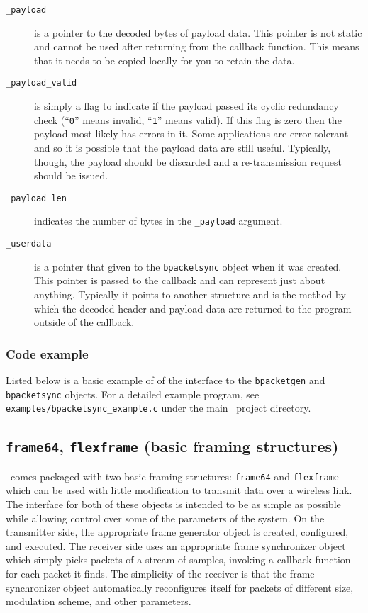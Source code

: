 %
\begin{description}
\item[{\tt \_payload}]
    is a pointer to the decoded bytes of payload data.
    This pointer is not static and cannot be used after returning from
    the callback function.
    This means that it needs to be copied locally for you to retain the
    data.
\item[{\tt \_payload\_valid}]
    is simply a flag to indicate if the payload passed its cyclic
    redundancy check
    (``{\tt 0}'' means invalid, ``{\tt 1}'' means valid).
    If this flag is zero then the payload most likely has errors in it.
    Some applications are error tolerant and so it is possible that the
    payload data are still useful.
    Typically, though, the payload should be discarded and a
    re-transmission request should be issued.
\item[{\tt \_payload\_len}]
    indicates the number of bytes in the {\tt \_payload} argument.
\item[{\tt \_userdata}]
    is a pointer that given to the {\tt bpacketsync} object when it was
    created.
    This pointer is passed to the callback and can represent just about
    anything.
    Typically it points to another structure and is the method
    by which the decoded header and payload data are returned to the
    program outside of the callback.
\end{description}


% 
\subsubsection{Code example}
\label{module:framing:bpacket:code_example}
%
Listed below is a basic example of of the interface to the
{\tt bpacketgen} and
{\tt bpacketsync} objects.
For a detailed example program, see
{\tt examples/bpacketsync\_example.c} under the main \liquid\ project
directory.
%


% 
%
\subsection{{\tt frame64}, {\tt flexframe} (basic framing structures)}
\label{module:framing:frames}
\liquid\ comes packaged with two basic framing structures: {\tt frame64} and
{\tt flexframe} which can be used with little modification to transmit data
over a wireless link.
The interface for both of these objects is intended to be as simple as
possible while allowing control over some of the parameters of the system.
On the transmitter side, the appropriate frame generator object is created,
configured, and executed.
The receiver side uses an appropriate frame synchronizer object which simply
picks packets of a stream of samples, invoking a callback function for each
packet it finds.
The simplicity of the receiver is that the frame synchronizer object
automatically reconfigures itself for packets of different size, modulation
scheme, and other parameters.

